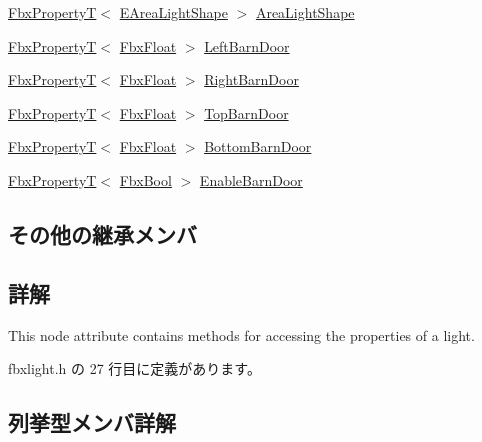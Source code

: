 \begin{DoxyCompactItemize}
\item 
\hyperlink{class_fbx_property_t}{Fbx\+PropertyT}$<$ \hyperlink{class_fbx_light_a9bc60eabc41255f46f35d1f6acd274cd}{E\+Area\+Light\+Shape} $>$ \hyperlink{class_fbx_light_a2d2ad2128f1ae61151c15d7de259d2e8}{Area\+Light\+Shape}
\item 
\hyperlink{class_fbx_property_t}{Fbx\+PropertyT}$<$ \hyperlink{fbxtypes_8h_aef968e37f2ddc4188de464d8578c1d5c}{Fbx\+Float} $>$ \hyperlink{class_fbx_light_afcf3b7db2cad32e11bb6fa016a402bc7}{Left\+Barn\+Door}
\item 
\hyperlink{class_fbx_property_t}{Fbx\+PropertyT}$<$ \hyperlink{fbxtypes_8h_aef968e37f2ddc4188de464d8578c1d5c}{Fbx\+Float} $>$ \hyperlink{class_fbx_light_aea237e743f2b2e2d5a2e3cdf28a78290}{Right\+Barn\+Door}
\item 
\hyperlink{class_fbx_property_t}{Fbx\+PropertyT}$<$ \hyperlink{fbxtypes_8h_aef968e37f2ddc4188de464d8578c1d5c}{Fbx\+Float} $>$ \hyperlink{class_fbx_light_a22b02c12b00c38da4d38a21876ec5340}{Top\+Barn\+Door}
\item 
\hyperlink{class_fbx_property_t}{Fbx\+PropertyT}$<$ \hyperlink{fbxtypes_8h_aef968e37f2ddc4188de464d8578c1d5c}{Fbx\+Float} $>$ \hyperlink{class_fbx_light_aef1e933e3a3baea5ad804868750cbd04}{Bottom\+Barn\+Door}
\item 
\hyperlink{class_fbx_property_t}{Fbx\+PropertyT}$<$ \hyperlink{fbxtypes_8h_a92e0562b2fe33e76a242f498b362262e}{Fbx\+Bool} $>$ \hyperlink{class_fbx_light_add61baef63184934eeb71ede6328354c}{Enable\+Barn\+Door}
\end{DoxyCompactItemize}
\subsection*{その他の継承メンバ}


\subsection{詳解}
This node attribute contains methods for accessing the properties of a light. 

 fbxlight.\+h の 27 行目に定義があります。



\subsection{列挙型メンバ詳解}
\mbox{\label{class_fbx_light_a9bc60eabc41255f46f35d1f6acd274cd}} 
